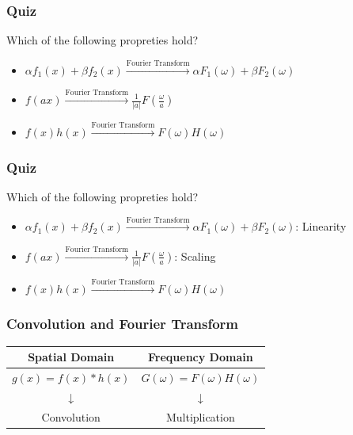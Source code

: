 \documentclass{beamer}
\begin{document}
\begin{frame}
	\frametitle{Quiz}
	\center
Which of the following propreties hold?
	\vspace{1cm}
\begin{itemize}
		 \pause
	\item $ \alpha f_1(x) + \beta f_2(x) \xrightarrow{\text{Fourier Transform}} \alpha F_1(\omega) + \beta F_2(\omega)$
		 \pause
	\item $ f(ax)  \xrightarrow{\text{Fourier Transform}}  \frac{1}{|a|}F(\frac{\omega}{a})$
		 \pause
	\item $ f(x)h(x)  \xrightarrow{\text{Fourier Transform}}F(\omega)H(\omega)$
\end{itemize}
\end{frame}
\begin{frame}
	\frametitle{Quiz}
	\center
Which of the following propreties hold?
	\vspace{1cm}
\begin{itemize}
	\item \colorbox{green!30}{$ \alpha f_1(x) + \beta f_2(x) \xrightarrow{\text{Fourier Transform}} \alpha F_1(\omega) + \beta F_2(\omega)$: Linearity}
	\item \colorbox{green!30}{$ f(ax)  \xrightarrow{\text{Fourier Transform}}  \frac{1}{|a|}F(\frac{\omega}{a})$: Scaling}
	\item \colorbox{red!30}{$f(x)h(x)  \xrightarrow{\text{Fourier Transform}}F(\omega)H(\omega)$}
\end{itemize}
\end{frame}


\begin{frame}
	\frametitle{Convolution and Fourier Transform}
\begin{center}
\begin{tabular}{|c|c|}
\hline
\textbf{Spatial Domain} & \textbf{Frequency Domain} \\
\hline
	$g(x) = f(x)*h(x) $& $G(\omega) = F(\omega)H(\omega)$ \\
	$\downarrow$ & $\downarrow$ \\
	Convolution & Multiplication
\end{tabular}
\end{center}
\end{frame}
\end{document}
